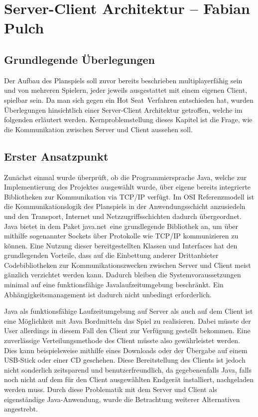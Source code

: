 \chapter{Server-Client Architektur -- Fabian Pulch}

\section{Grundlegende Überlegungen}
Der Aufbau des Planspiels soll zuvor bereits beschrieben multiplayerfähig sein und von mehreren Spielern, jeder jeweils ausgestattet mit einem eigenen Client, spielbar sein. Da man sich gegen ein \glqq Hot Seat\grqq \  Verfahren entschieden hat, wurden Überlegungen hinsichtlich einer Server-Client Architektur getroffen, welche im folgenden erläutert werden. Kernproblemstellung dieses Kapitel ist die Frage, wie die Kommunikation zwischen Server und Client aussehen soll.

\section{Erster Ansatzpunkt}
Zunächst einmal wurde überprüft, ob die Programmiersprache Java, welche zur Implementierung des Projektes ausgewählt wurde, über eigene bereits integrierte Bibliotheken zur Kommunikation via TCP/IP verfügt. Im OSI Referenzmodell ist die Kommunikationslogik des Planspiels in der Anwendungsschicht anzusiedeln und den Transport, Internet und Netzzugriffsschichten dadurch übergeordnet.
Java bietet in dem Paket \glqq java.net\grqq \ eine grundlegende Bibliothek an, um über mithilfe sogenannter Sockets über Protokolle wie TCP/IP kommunizieren zu können. Eine Nutzung dieser bereitgestellten Klassen und Interfaces hat den grundlegenden Vorteile, dass auf die Einbettung anderer Drittanbieter Codebibliotheken zur Kommunikationszwecken zwischen Server und Client meist gänzlich verzichtet werden kann. Dadurch bleiben die Systemvoraussetzungen minimal auf eine funktionsfähige Javalaufzeitumgebung beschränkt.  Ein Abhängigkeitsmanagement ist dadurch nicht unbedingt erforderlich.

Java als funktionsfähige Laufzeitumgebung auf Server als auch auf dem Client ist eine Möglichkeit mit Java Bordmitteln das Spiel zu realisieren. Dabei müsste der User allerdings in diesem Fall den Client zur Verfügung gestellt bekommen. Eine zuverlässige Verteilungsmethode des Client müsste also gewährleistet werden. Dies kann beispielsweise mithilfe eines Downloads oder der Übergabe auf einem USB-Stick oder einer CD geschehen. Diese Bereitstellung des Clients ist jedoch nicht sonderlich zeitsparend und benutzerfreundlich, da gegebenenfalls Java, falls noch nicht auf dem für den Client ausgewählten Endgerät installiert, nachgeladen werden muss. Durch diese Problematik mit dem Server und Client als eigenständige Java-Anwendung, wurde die Betrachtung weiterer Alternativen angestrebt.

